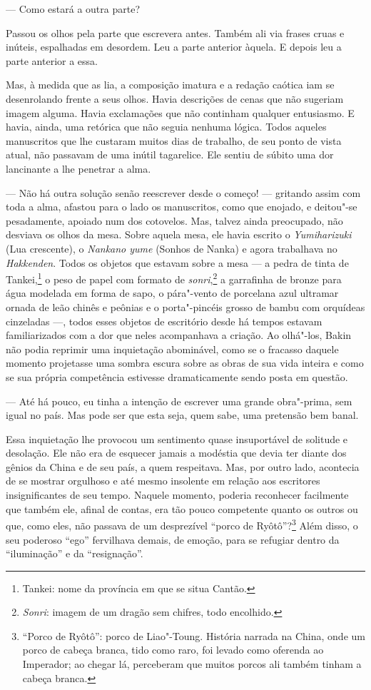 --- Como estará a outra parte?

Passou os olhos pela parte que escrevera antes. Também ali via frases 
cruas e inúteis, espalhadas em desordem. Leu a parte anterior àquela. E
depois leu a parte anterior a essa.

Mas, à medida que as lia, a composição imatura e a redação caótica iam
se desenrolando frente a seus olhos. Havia descrições de cenas que não
sugeriam imagem alguma. Havia exclamações que não continham qualquer
entusiasmo. E havia, ainda, uma retórica que não seguia nenhuma lógica.
Todos aqueles manuscritos que lhe custaram muitos dias de trabalho, de
seu ponto de vista atual, não passavam de uma inútil tagarelice. Ele
sentiu de súbito uma dor lancinante a lhe penetrar a alma.

--- Não há outra solução senão reescrever desde o começo! --- gritando assim
com toda a alma, afastou para o lado os manuscritos, como que enojado,
e deitou"-se pesadamente, apoiado num dos cotovelos. Mas, talvez ainda
preocupado, não desviava os olhos da mesa. Sobre aquela mesa, ele havia
escrito o \textit{Yumiharizuki} (Lua crescente), o \textit{Nankano
yume} (Sonhos de Nanka) e agora trabalhava no \textit{Hakkenden}. Todos
os objetos que estavam sobre a mesa --- a pedra de tinta de
Tankei,\footnote{ Tankei: nome da província em que se situa Cantão.} o
peso de papel com formato de \textit{sonri},\footnote{ \textit{Sonri}: 
imagem de um dragão sem chifres, todo
encolhido.} a garrafinha de bronze para água modelada em forma de
sapo, o pára"-vento de porcelana azul ultramar ornada de leão chinês e
peônias e o porta"-pincéis grosso de bambu com orquídeas cinzeladas ---,
todos esses objetos de escritório desde há tempos estavam
familiarizados com a dor que neles acompanhava a criação. Ao olhá"-los,
Bakin não podia reprimir uma inquietação abominável, como se o fracasso
daquele momento projetasse uma sombra escura sobre as obras de sua vida
inteira e como se sua própria competência estivesse dramaticamente
sendo posta em questão.

--- Até há pouco, eu tinha a intenção de escrever uma grande obra"-prima,
sem igual no país. Mas pode ser que esta seja, quem sabe, uma pretensão
bem banal.

Essa inquietação lhe provocou um sentimento quase insuportável de
solitude e desolação. Ele não era de esquecer jamais a modéstia\textit{
}que devia ter diante dos gênios da China e de seu país, a quem
respeitava. Mas, por outro lado, acontecia de se mostrar orgulhoso e
até mesmo insolente em relação aos escritores insignificantes de seu
tempo. Naquele momento, poderia reconhecer facilmente que também ele,
afinal de contas, era tão pouco competente quanto os outros ou que,
como eles, não passava de um desprezível ``porco de Ryôtô''?\footnote{ ``Porco de Ryôtô'': 
porco de Liao"-Toung. História narrada na China, onde
um porco de cabeça branca, tido como raro, foi levado como oferenda ao
Imperador; ao chegar lá, perceberam que muitos porcos ali também tinham
a cabeça branca.} Além disso, o seu poderoso ``ego'' fervilhava demais,
de emoção, para se refugiar dentro da ``iluminação'' e da ``resignação''.


